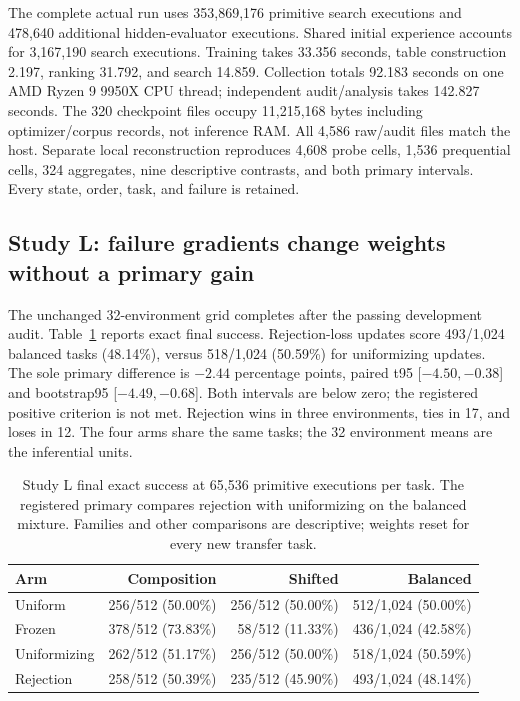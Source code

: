\documentclass[11pt]{article}
\begin{document}
The complete actual run uses 353,869,176 primitive search executions and
478,640 additional hidden-evaluator executions. Shared initial experience
accounts for 3,167,190 search executions. Training takes 33.356 seconds,
table construction 2.197, ranking 31.792, and search 14.859. Collection totals
92.183 seconds on one AMD Ryzen 9 9950X CPU thread; independent audit/analysis
takes 142.827 seconds. The 320 checkpoint files occupy 11,215,168 bytes
including optimizer/corpus records, not inference RAM. All 4,586 raw/audit
files match the host. Separate local reconstruction reproduces 4,608 probe
cells, 1,536 prequential cells, 324 aggregates, nine descriptive contrasts,
and both primary intervals. Every state, order, task, and failure is retained.

\subsection{Study L: failure gradients change weights without a primary gain}
The unchanged 32-environment grid completes after the passing development
audit. Table~\ref{tab:l-success} reports exact final success. Rejection-loss
updates score 493/1,024 balanced tasks (48.14\%), versus 518/1,024 (50.59\%)
for uniformizing updates. The sole primary difference is $-2.44$ percentage
points, paired t95 [$-4.50,-0.38$] and bootstrap95 [$-4.49,-0.68$]. Both
intervals are below zero; the registered positive criterion is not met.
Rejection wins in three environments, ties in 17, and loses in 12. The four
arms share the same tasks; the 32 environment means are the inferential units.

\begin{table}[ht]
\centering\small
\begin{tabular}{lrrr}
\toprule
Arm & Composition & Shifted & Balanced \\
\midrule
Uniform & 256/512 (50.00\%) & 256/512 (50.00\%) & 512/1,024 (50.00\%) \\
Frozen & 378/512 (73.83\%) & 58/512 (11.33\%) & 436/1,024 (42.58\%) \\
Uniformizing & 262/512 (51.17\%) & 256/512 (50.00\%) & 518/1,024 (50.59\%) \\
Rejection & 258/512 (50.39\%) & 235/512 (45.90\%) & 493/1,024 (48.14\%) \\
\bottomrule
\end{tabular}
\caption{Study L final exact success at 65,536 primitive executions per task.
 The registered primary compares rejection with uniformizing on the balanced
 mixture. Families and other comparisons are descriptive; weights reset for
 every new transfer task.}
\label{tab:l-success}
\end{table}
\end{document}

